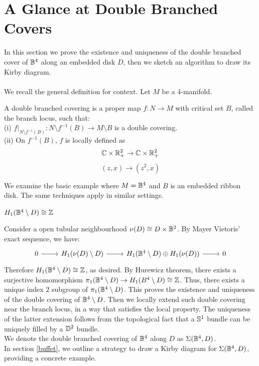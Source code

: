\section{A Glance at Double Branched Covers}\label{covers}
In this section we prove the existence and uniqueness of the double branched cover of $\mathbb{B}^4$ along an embedded disk $D$, then we sketch an algorithm to draw its Kirby diagram. \\ \\
We recall the general definition for context. Let $M$ be a $4$-manifold.
\begin{defn}
A double branched covering is a proper map $f :N \rightarrow M$ with critical set $B$, called the branch locus, such that:  \\
(i) $f|_{N \setminus f^{-1}(B)} : N \setminus f^{-1}(B) \rightarrow M \setminus B$
is a double covering. \\
(ii) On $f^{-1}(B)$, $f$ is locally defined as $$
\mathbb{C} \times \mathbb{R}_{+}^2 \rightarrow \mathbb{C} \times \mathbb{R}_{+}^2
$$ $$ (z, x) \rightarrow (z^2, x)
$$
\end{defn}
We examine the basic example where $M = \mathbb{B}^4$ and $B$ is an embedded ribbon disk. 
The same techniques apply in similar settings.
\begin{lem} $H_1(\mathbb{B}^4\setminus D) \cong \mathbb{Z}$
\end{lem}
\proof
Consider a open tubular neighbourhood $\nu(D) \cong D \times \mathbb{B}^2$. By Mayer Vietoris' exact sequence, we have: $$
\begin{tikzcd}
0 \arrow[r] & H_1(\nu(D) \setminus D) \arrow[r] & H_1(\B^4 \setminus D)\oplus H_1(\nu(D)) \arrow[r] & 0
\end{tikzcd}
$$
Therefore $H_1(\mathbb{B}^4 \setminus D)\cong \mathbb{Z}$, as desired.
\endproof
By Hurewicz theorem, there exists a surjective homomorphism $\pi_1(\mathbb{B}^4\setminus D) \rightarrow H_1(B^4\setminus D) \cong \mathbb{Z}$. Thus, there exists a unique index $2$ subgroup of $\pi_1(\mathbb{B}^4 \setminus D)$.
This proves the existence and uniqueness of the double covering of $\mathbb{B}^4 \setminus D$. 
Then we locally extend such double covering near the branch locus, in a way that satisfies the local property. The uniqueness of the latter extension follows from the topological fact that a $\mathbb{S}^1$ bundle can be uniquely filled by a $\mathbb{D}^2$ bundle. \\ We denote the double branched covering of $\mathbb{B}^4$ along $D$ as $\Sigma(\mathbb{B}^4, D)$.
\\ 
In section \ref{buffet}, we outline a strategy to draw a Kirby diagram for $\Sigma(\mathbb{B}^4, D)$, providing a concrete example.